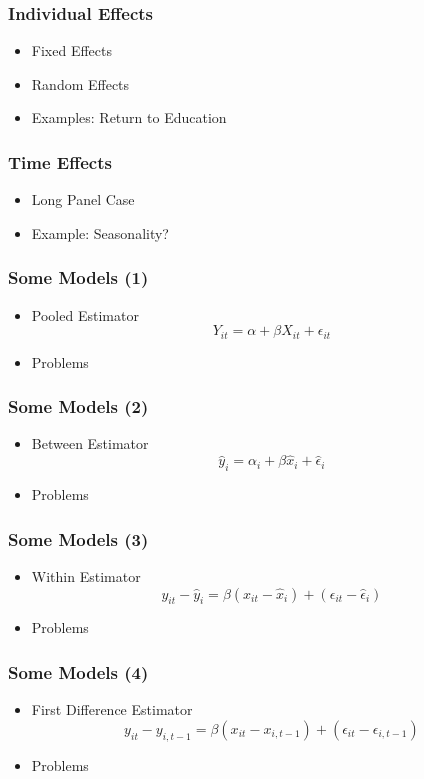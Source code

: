 \documentclass{beamer}
\newcommand{\1}{\mathbb{1}}
\begin{document}
\begin{frame}\frametitle{Individual Effects}
\begin{itemize}
 \item Fixed Effects
 \item Random Effects
 \item Examples: Return to Education
\end{itemize}
\end{frame}

\begin{frame}\frametitle{Time Effects}
\begin{itemize}
 \item Long Panel Case
 \item Example: Seasonality? 
\end{itemize}
\end{frame}

\begin{frame}\frametitle{Some Models (1)}
\begin{itemize}
 \item Pooled Estimator
 \begin{equation}
  Y_{it} = \alpha + \beta X_{it} + \epsilon_{it}
 \end{equation}
\item Problems
\end{itemize}
\end{frame}

\begin{frame}\frametitle{Some Models (2)}
\begin{itemize}
 \item Between Estimator
 \begin{equation}
  \hat{y}_i = \alpha_i + \beta \hat{x}_{i} + \hat{\epsilon}_{i}
 \end{equation}
\item Problems
\end{itemize}
\end{frame}

\begin{frame}\frametitle{Some Models (3)}
\begin{itemize}
 \item Within Estimator
 \begin{equation}
 y_{it} - \hat{y}_i =  \beta (x_{it} - \hat{x}_{i}) + 
 (\epsilon_{it} - \hat{\epsilon}_{i})
 \end{equation}
\item Problems
\end{itemize}
\end{frame}

\begin{frame}\frametitle{Some Models (4)}
\begin{itemize}
 \item First Difference Estimator
 \begin{equation}
 y_{it} - y_{i,t-1} =  \beta (x_{it} - x_{i,t-1}) + 
 (\epsilon_{it} - \epsilon_{i,t-1})
 \end{equation}
\item Problems
\end{itemize}

\end{frame}
\end{document}
